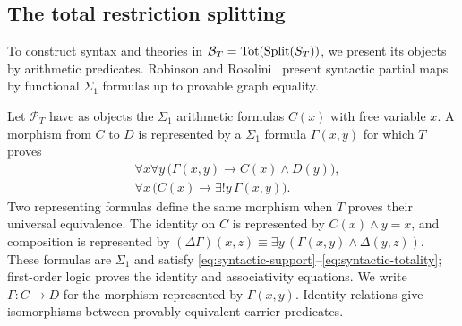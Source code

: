\subsection{The total restriction splitting}
\label{subsec:syntactic-total-splitting}

To construct syntax and theories in
$\mathcal B_T=\operatorname{Tot}(\operatorname{Split}(S_T))$, we present its objects by
arithmetic predicates. Robinson and Rosolini~\cite[pp.~108--109]{RobinsonRosolini}
present syntactic partial maps by functional $\Sigma_1$ formulas
up to provable graph equality.

Let $\mathcal P_T$ have as objects the $\Sigma_1$ arithmetic formulas
$C(x)$ with free variable $x$. A morphism from $C$ to $D$
is represented by a $\Sigma_1$ formula $\Gamma(x,y)$ for which $T$
proves
\begin{align}
 &\forall x\forall y\,
   \bigl(\Gamma(x,y)\longrightarrow C(x)\land D(y)\bigr),
                                               \label{eq:syntactic-support}\\
 &\forall x\,
   \bigl(C(x)\longrightarrow\exists!y\,\Gamma(x,y)\bigr).
                                               \label{eq:syntactic-totality}
\end{align}
Two representing formulas define the same morphism when $T$ proves
their universal equivalence. The identity on $C$ is represented by
$C(x)\land y=x$, and composition is represented by
$(\Delta\Gamma)(x,z)\equiv
\exists y\,(\Gamma(x,y)\land\Delta(y,z))$.
These formulas are $\Sigma_1$ and satisfy
\eqref{eq:syntactic-support}--\eqref{eq:syntactic-totality}; first-order
logic proves the identity and associativity equations. We write
$\Gamma:C\to D$ for the morphism represented by $\Gamma(x,y)$.
Identity relations give isomorphisms between provably equivalent
carrier predicates.

